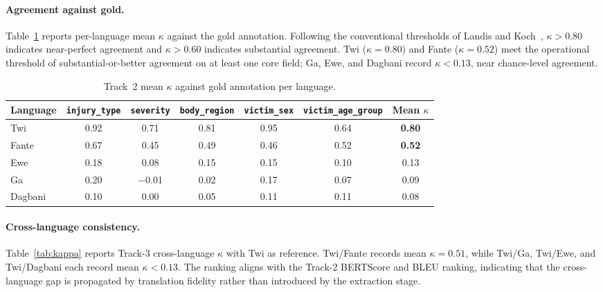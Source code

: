 \documentclass[conference]{IEEEtran}
\begin{document}
\paragraph{Agreement against gold.}
Table~\ref{tab:kappa_gold} reports per-language mean $\kappa$ against
the gold annotation. Following the conventional thresholds of Landis
and Koch~\cite{landis1977}, $\kappa > 0.80$ indicates near-perfect
agreement and $\kappa > 0.60$ indicates substantial agreement. Twi
($\kappa = 0.80$) and Fante ($\kappa = 0.52$) meet the operational
threshold of substantial-or-better agreement on at least one core
field; Ga, Ewe, and Dagbani record $\kappa < 0.13$, near
chance-level agreement.

\begin{table}[!t]
\caption{Track~2 mean $\kappa$ against gold annotation per language.}
\label{tab:kappa_gold}
\centering
\begin{tabular}{lcccccc}
\toprule
\textbf{Language}
  & \texttt{injury\_type}
  & \texttt{severity}
  & \texttt{body\_region}
  & \texttt{victim\_sex}
  & \texttt{victim\_age\_group}
  & \textbf{Mean $\kappa$} \\
\midrule
Twi     & 0.92 & 0.71 & 0.81 & 0.95 & 0.64 & \textbf{0.80} \\
Fante   & 0.67 & 0.45 & 0.49 & 0.46 & 0.52 & \textbf{0.52} \\
Ewe     & 0.18 & 0.08 & 0.15 & 0.15 & 0.10 & 0.13 \\
Ga      & 0.20 & $-$0.01 & 0.02 & 0.17 & 0.07 & 0.09 \\
Dagbani & 0.10 & 0.00 & 0.05 & 0.11 & 0.11 & 0.08 \\
\bottomrule
\end{tabular}
\end{table}

\paragraph{Cross-language consistency.}
Table~\ref{tab:kappa} reports Track-3 cross-language $\kappa$ with
Twi as reference. Twi/Fante records mean $\kappa = 0.51$, while
Twi/Ga, Twi/Ewe, and Twi/Dagbani each record mean $\kappa < 0.13$.
The ranking aligns with the Track-2 BERTScore and BLEU ranking,
indicating that the cross-language gap is propagated by translation
fidelity rather than introduced by the extraction stage.
\end{document}
